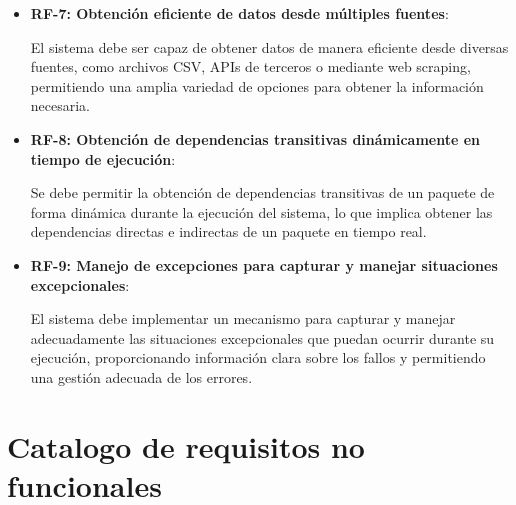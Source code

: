\begin{itemize}
    \item \textbf{RF-7: Obtención eficiente de datos desde múltiples fuentes}: 
	
	El sistema debe ser capaz de obtener datos de manera eficiente desde diversas fuentes, como archivos CSV, APIs de terceros o mediante web scraping, permitiendo una amplia variedad de opciones para obtener la información necesaria.
    
    \item \textbf{RF-8: Obtención de dependencias transitivas dinámicamente en tiempo de ejecución}: 
	
	Se debe permitir la obtención de dependencias transitivas de un paquete de forma dinámica durante la ejecución del sistema, lo que implica obtener las dependencias directas e indirectas de un paquete en tiempo real.
    
    \item \textbf{RF-9: Manejo de excepciones para capturar y manejar situaciones excepcionales}: 
	
	El sistema debe implementar un mecanismo para capturar y manejar adecuadamente las situaciones excepcionales que puedan ocurrir durante su ejecución, proporcionando información clara sobre los fallos y permitiendo una gestión adecuada de los errores.
\end{itemize}

\section{Catalogo de requisitos no funcionales}

